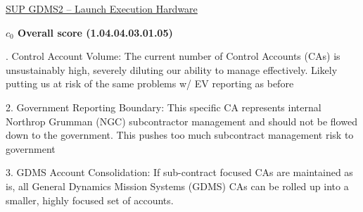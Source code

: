 % 


\begin{frame}{\href{run:../local/source-docs/1.04.04.03.01.05.pdf}{SUP GDMS2 – Launch Execution Hardware}}
\centering
{}
\par
\vspace{0.75em}
\textbf{\small{\(c_0\) Overall score {\tiny (1.04.04.03.01.05)}}}\\\par
\vspace{0.5em}
\begin{minipage}{0.85\textwidth}
\raggedright
\fontsize{7}{9}. Control Account Volume: The current number of Control Accounts (CAs) is unsustainably high, severely diluting our ability to manage effectively. Likely putting us at risk of the same problems w/ EV reporting as before\par\vspace{0.5em}2. Government Reporting Boundary: This specific CA represents internal Northrop Grumman (NGC) subcontractor management and should not be flowed down to the government. This pushes too much subcontract management risk to government\par\vspace{0.5em}3. GDMS Account Consolidation: If sub-contract focused CAs are maintained as is, all General Dynamics Mission Systems (GDMS) CAs can be rolled up into a smaller, highly focused set of accounts.\par
\end{minipage}
\end{frame}

